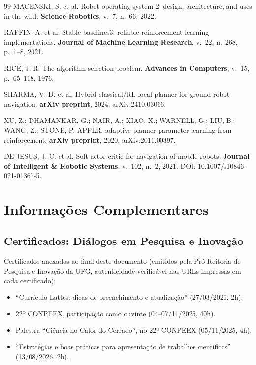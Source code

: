 \documentclass[12pt, a4paper]{article}
\begin{document}
\begin{thebibliography}{99}
MACENSKI, S. et al. Robot operating system 2: design, architecture, and uses in the wild.
\textbf{Science Robotics}, v.~7, n.~66, 2022.

RAFFIN, A. et al. Stable-baselines3: reliable reinforcement learning implementations.
\textbf{Journal of Machine Learning Research}, v.~22, n.~268, p.~1--8, 2021.

RICE, J. R. The algorithm selection problem. \textbf{Advances in Computers}, v.~15,
p.~65--118, 1976.

SHARMA, V. D. et al. Hybrid classical/RL local planner for ground robot navigation.
\textbf{arXiv preprint}, 2024. arXiv:2410.03066.

XU, Z.; DHAMANKAR, G.; NAIR, A.; XIAO, X.; WARNELL, G.; LIU, B.; WANG, Z.; STONE, P. APPLR:
adaptive planner parameter learning from reinforcement. \textbf{arXiv preprint}, 2020.
arXiv:2011.00397.

DE JESUS, J. C. et al. Soft actor-critic for navigation of mobile robots.
\textbf{Journal of Intelligent \& Robotic Systems}, v.~102, n.~2, 2021.
DOI: 10.1007/s10846-021-01367-5.

\end{thebibliography}

\newpage
\section*{Informações Complementares}

\subsection*{Certificados: Diálogos em Pesquisa e Inovação}
Certificados anexados ao final deste documento (emitidos pela Pró-Reitoria de Pesquisa e
Inovação da UFG, autenticidade verificável nas URLs impressas em cada certificado):
\begin{itemize}\setlength{\itemsep}{0pt}\setlength{\parskip}{0pt}
  \item ``Currículo Lattes: dicas de preenchimento e atualização'' (27/03/2026, 2h).
  \item 22º CONPEEX, participação como ouvinte (04--07/11/2025, 40h).
  \item Palestra ``Ciência no Calor do Cerrado'', no 22º CONPEEX (05/11/2025, 4h).
  \item ``Estratégias e boas práticas para apresentação de trabalhos científicos''
        (13/08/2026, 2h).
\end{itemize}





\end{document}

